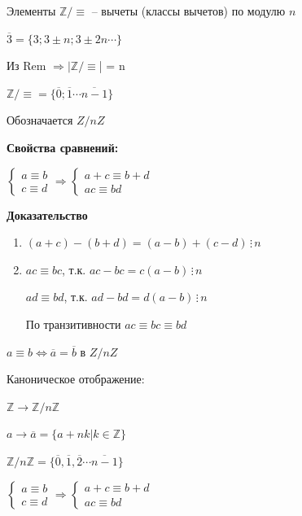 \documentclass[14pt, letter paper]{article}
\begin{document}
Элементы $\mathbb{Z}/\equiv$ -- вычеты (классы вычетов) по модулю $n$

$\overline{3} = \{ 3; 3 \pm n; 3 \pm 2n \cdots \}$

Из Rem $\Rightarrow |\mathbb{Z}/\equiv$| = n

$\mathbb{Z}/\equiv = \{ \overline{0}; \overline{1} \cdots \overline{n - 1} \}$

Обозначается $Z/nZ$

\textbf{Свойства сравнений:}

$\begin{cases}
    a \equiv b \\
    c \equiv d
\end{cases} \Rightarrow \begin{cases}
    a + c \equiv b + d \\
    ac \equiv bd
\end{cases}$

\begin{center}
    \textbf{Доказательство}
\end{center}

\begin{enumerate}
    \item $(a + c) - (b + d) = (a - b) + (c - d) \, \vdots \, n$
    \item $ac \equiv bc$, т.к. $ac - bc = c(a - b) \, \vdots \, n$

    $ad \equiv bd$, т.к. $ad - bd = d(a-b) \, \vdots \, n$

    По транзитивности $ac \equiv bc \equiv bd$
\end{enumerate}

$a \equiv b \Leftrightarrow \overline{a} = \overline{b}$ в $Z/nZ$

Каноническое отображение:

$\mathbb{Z} \rightarrow \mathbb{Z}/n\mathbb{Z}$

$a \rightarrow \overline{a} = \{ a + nk | k \in \mathbb{Z}\}$

$\mathbb{Z}/n\mathbb{Z} = \{ \overline{0}, \overline{1}, \overline{2} \cdots \overline{n-1} \}$

$\begin{cases}
    a \equiv b \\
    c \equiv d
\end{cases} \Rightarrow \begin{cases}
    a + c \equiv b + d \\
    ac \equiv bd
\end{cases}$
\end{document}
